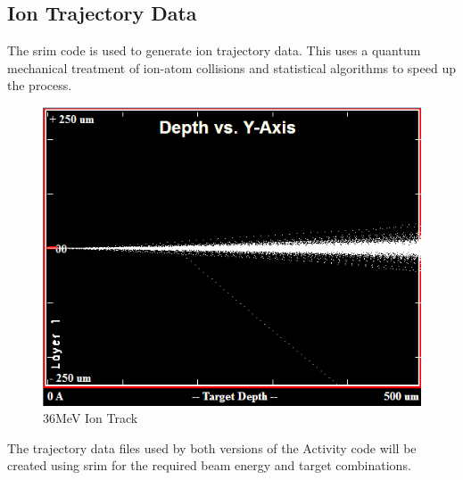 \subsection{Ion Trajectory Data}

The \acrshort{srim} code is used to generate ion trajectory data.  This uses a quantum mechanical treatment of ion-atom collisions and statistical algorithms to speed up the process\cite{srimwebsite}.

\begin{figure}[htp]
  \begin{center}
    \includegraphics[scale=0.55]{chapters/activity_code/images/ion_transport.png}
    \caption{36MeV Ion Track}
    \label{graph:graph1}
  \end{center}
\end{figure}

The trajectory data files used by both versions of the Activity code will be created using \acrshort{srim} for the required beam energy and target combinations.

